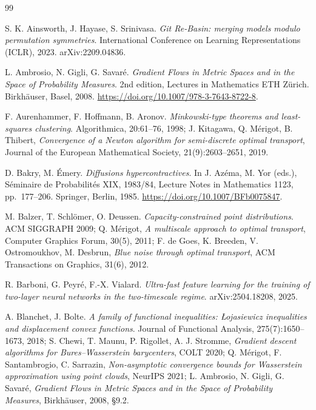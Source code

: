 \begin{thebibliography}{99}

S. K. Ainsworth, J. Hayase, S. Srinivasa.
\emph{Git Re-Basin: merging models modulo permutation symmetries}.
International Conference on Learning Representations (ICLR), 2023.
arXiv:2209.04836.

L. Ambrosio, N. Gigli, G. Savar\'e.
\emph{Gradient Flows in Metric Spaces and in the Space of Probability Measures}.
2nd edition, Lectures in Mathematics ETH Z\"urich. Birkh\"auser, Basel, 2008.
\url{https://doi.org/10.1007/978-3-7643-8722-8}.

F. Aurenhammer, F. Hoffmann, B. Aronov.
\emph{Minkowski-type theorems and least-squares clustering}.
Algorithmica, 20:61--76, 1998;
J. Kitagawa, Q. M\'erigot, B. Thibert, \emph{Convergence of a Newton algorithm for semi-discrete optimal
transport}, Journal of the European Mathematical Society, 21(9):2603--2651, 2019.

D. Bakry, M. \'Emery.
\emph{Diffusions hypercontractives}.
In J. Az\'ema, M. Yor (eds.), S\'eminaire de Probabilit\'es XIX, 1983/84, Lecture Notes in Mathematics 1123,
pp.~177--206. Springer, Berlin, 1985.
\url{https://doi.org/10.1007/BFb0075847}.

M. Balzer, T. Schl\"omer, O. Deussen.
\emph{Capacity-constrained point distributions}.
ACM SIGGRAPH 2009;
Q. M\'erigot, \emph{A multiscale approach to optimal transport}, Computer Graphics Forum, 30(5), 2011;
F. de Goes, K. Breeden, V. Ostromoukhov, M. Desbrun, \emph{Blue noise through optimal transport},
ACM Transactions on Graphics, 31(6), 2012.

R. Barboni, G. Peyr\'e, F.-X. Vialard.
\emph{Ultra-fast feature learning for the training of two-layer neural networks in the two-timescale regime}.
arXiv:2504.18208, 2025.

A. Blanchet, J. Bolte.
\emph{A family of functional inequalities: {\L}ojasiewicz inequalities and displacement convex functions}.
Journal of Functional Analysis, 275(7):1650--1673, 2018;
S. Chewi, T. Maunu, P. Rigollet, A. J. Stromme, \emph{Gradient descent algorithms for Bures--Wasserstein
barycenters}, COLT 2020;
Q. M\'erigot, F. Santambrogio, C. Sarrazin, \emph{Non-asymptotic convergence bounds for Wasserstein approximation
using point clouds}, NeurIPS 2021;
L. Ambrosio, N. Gigli, G. Savar\'e, \emph{Gradient Flows in Metric Spaces and in the Space of Probability Measures},
Birkh\"auser, 2008, \S9.2.


\end{thebibliography}
